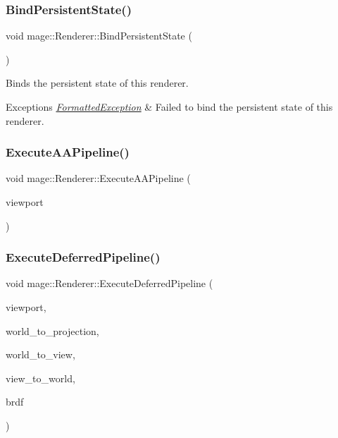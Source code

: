 \subsubsection{\texorpdfstring{Bind\+Persistent\+State()}{BindPersistentState()}}
{\footnotesize\ttfamily void mage\+::\+Renderer\+::\+Bind\+Persistent\+State (\begin{DoxyParamCaption}{ }\end{DoxyParamCaption})}

Binds the persistent state of this renderer.


\begin{DoxyExceptions}{Exceptions}
{\em \hyperlink{classmage_1_1_formatted_exception}{Formatted\+Exception}} & Failed to bind the persistent state of this renderer. \\
\hline
\end{DoxyExceptions}
\hypertarget{classmage_1_1_renderer_a30e9ae9fb0d9cd0f105f0fb2181d34b1}{}\label{classmage_1_1_renderer_a30e9ae9fb0d9cd0f105f0fb2181d34b1} 
\subsubsection{\texorpdfstring{Execute\+A\+A\+Pipeline()}{ExecuteAAPipeline()}}
{\footnotesize\ttfamily void mage\+::\+Renderer\+::\+Execute\+A\+A\+Pipeline (\begin{DoxyParamCaption}\item[{const \hyperlink{classmage_1_1_viewport}{Viewport} \&}]{viewport }\end{DoxyParamCaption})\hspace{0.3cm}{\ttfamily [private]}}

\hypertarget{classmage_1_1_renderer_a2a218f2947b17b5ebec1d49ff5ec194e}{}\label{classmage_1_1_renderer_a2a218f2947b17b5ebec1d49ff5ec194e} 
\subsubsection{\texorpdfstring{Execute\+Deferred\+Pipeline()}{ExecuteDeferredPipeline()}}
{\footnotesize\ttfamily void mage\+::\+Renderer\+::\+Execute\+Deferred\+Pipeline (\begin{DoxyParamCaption}\item[{const \hyperlink{classmage_1_1_viewport}{Viewport} \&}]{viewport,  }\item[{F\+X\+M\+M\+A\+T\+R\+IX}]{world\+\_\+to\+\_\+projection,  }\item[{C\+X\+M\+M\+A\+T\+R\+IX}]{world\+\_\+to\+\_\+view,  }\item[{C\+X\+M\+M\+A\+T\+R\+IX}]{view\+\_\+to\+\_\+world,  }\item[{\hyperlink{namespacemage_ae7a7a03a7b34d7e2689689bb8295cd38}{B\+R\+D\+F\+Type}}]{brdf }\end{DoxyParamCaption})\hspace{0.3cm}{\ttfamily [private]}}

